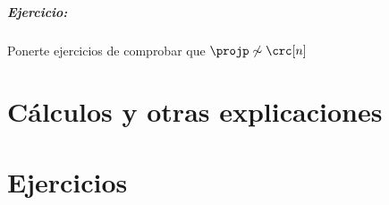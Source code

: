 \documentclass[palatino, bibnumbers]{apuntes}
\begin{document}
\paragraph{Ejercicio:}
Ponerte ejercicios de comprobar que $\projp \not\sim \crc[n]$


\appendix

\chapter{Cálculos y otras explicaciones}


\chapter{Ejercicios}


{}
\printindex
\end{document}
